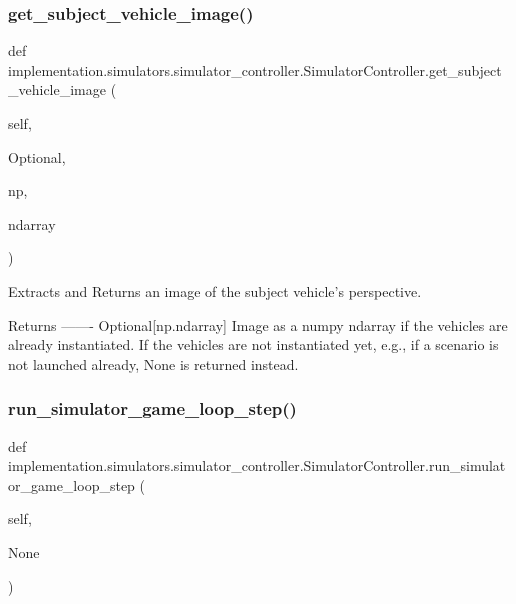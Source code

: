 \subsubsection{\texorpdfstring{get\+\_\+subject\+\_\+vehicle\+\_\+image()}{get\_subject\_vehicle\_image()}}
{\footnotesize\ttfamily def implementation.\+simulators.\+simulator\+\_\+controller.\+Simulator\+Controller.\+get\+\_\+subject\+\_\+vehicle\+\_\+image (\begin{DoxyParamCaption}\item[{}]{self,  }\item[{}]{Optional,  }\item[{}]{np,  }\item[{}]{ndarray }\end{DoxyParamCaption})}

\begin{DoxyVerb}Extracts and Returns an image of the subject vehicle's perspective.

Returns
-------
Optional[np.ndarray]
    Image as a numpy ndarray if the vehicles are already instantiated. If the vehicles are not instantiated yet,
    e.g., if a scenario is not launched already, None is returned instead.
\end{DoxyVerb}
 \mbox{\label{classimplementation_1_1simulators_1_1simulator__controller_1_1_simulator_controller_a8e44240be7fae6640ce790bf2e765564}} 
\subsubsection{\texorpdfstring{run\+\_\+simulator\+\_\+game\+\_\+loop\+\_\+step()}{run\_simulator\_game\_loop\_step()}}
{\footnotesize\ttfamily def implementation.\+simulators.\+simulator\+\_\+controller.\+Simulator\+Controller.\+run\+\_\+simulator\+\_\+game\+\_\+loop\+\_\+step (\begin{DoxyParamCaption}\item[{}]{self,  }\item[{}]{None }\end{DoxyParamCaption})}

